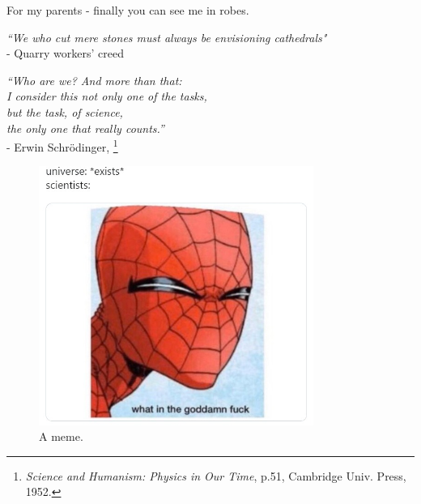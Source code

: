 

\newpage
\noindent\large{For my parents - finally you can see me in robes.}\newline
\mbox{}
\vfill
\begin{flushright}
\large{\emph{``We who cut mere stones must always be envisioning cathedrals"\\} 
- Quarry workers' creed}
\end{flushright}





\begin{adjustwidth}{6cm}{0cm}
\begin{flushright}
\emph{
``Who are we? And more than that: \\
I consider this not only one of the tasks,\\
 but \emph{the} task, of science, \\
the only one that really counts.''}\\
- Erwin Schr\"{o}dinger, \footnote{\emph{Science and Humanism: Physics in Our Time}, p.51, Cambridge Univ.
    Press, 1952.}\\
\end{flushright}
\end{adjustwidth}

\newpage
\thispagestyle{empty}
\vspace{7cm}
\begin{figure}
\centering
\includegraphics[width=0.8\textwidth]{fig/misc/spidey.jpeg}
\caption{A meme.}
\end{figure}
\cleardoublepage
